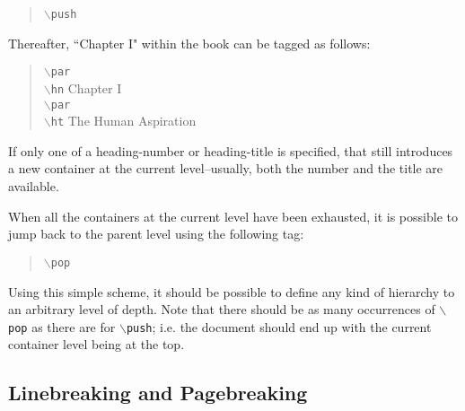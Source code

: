 \documentclass[11pt]{article}
\newcommand{\cmd}[1]{{\tt $\backslash$#1}}
\begin{document}
\begin{quote}
  \cmd{push}
\end{quote}

\noindent Thereafter, ``Chapter I" within the book can be tagged as follows:

\begin{quote}
  \cmd{par}\\
  \cmd{hn} Chapter I\\
  \cmd{par}\\
  \cmd{ht} The Human Aspiration
\end{quote}

\noindent If only one of a heading-number or heading-title is
specified, that still introduces a new container at the current
level--usually, both the number and the title are available.

When all the containers at the current level have been
exhausted, it is possible to jump back to the parent level using the
following tag:

\begin{quote}
  \cmd{pop}
\end{quote}

Using this simple scheme, it should be possible to define any kind of
hierarchy to an arbitrary level of depth. Note that there should be as
many occurrences of \cmd{pop} as there are for \cmd{push}; i.e. the
document should end up with the current container level being at the
top.

\subsection{Linebreaking and Pagebreaking}




\end{document}
